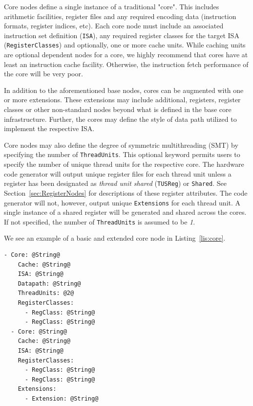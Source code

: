 \documentclass{article}
\begin{document}
Core nodes define a single instance of a traditional "core".  This includes arithmetic facilities, register files 
and any required encoding data (instruction formats, register indices, etc).  Each core node must include 
an associated instruction set definition (\texttt{ISA}), any required register classes for the target ISA (\texttt{RegisterClasses}) 
and optionally, one or more cache units.  While caching units are optional dependent nodes for a core, we 
highly recommend that cores have at least an instruction cache facility.  Otherwise, the instruction fetch 
performance of the core will be very poor.  

In addition to the aforementioned base nodes, cores can be augmented with one or more extensions.  These extensions 
may include additional, registers, register classes or other non-standard nodes beyond what is defined in the base 
core infrastructure.  Further, the cores may define the style of data path utilized to implement the respective ISA.

Core nodes may also define the degree of symmetric multithreading (SMT) by specifying the number of \texttt{ThreadUnits}.  
This optional keyword permits users to specify the number of unique thread units for the respective core.  The hardware 
code generator will output unique register files for each thread unit unless a register has been designated as 
\textit{thread unit shared} (\texttt{TUSReg}) or \texttt{Shared}.  See Section~\ref{sec:RegisterNodes} for descriptions 
of these register attributes.    
The code generator will not, however, output unique \texttt{Extensions} for each thread unit.  
A single instance of a shared register will be generated and shared across the cores.  If not specified, the number of 
\texttt{ThreadUnits} is assumed to be \textit{1}.  

We see an example of a basic and extended core node in Listing~\ref{lis:core}.   

\vspace{0.125in}
\begin{lstlisting}[frame=single,style=base,caption={Core Node Definition},captionpos=b,label={lis:core}]
- Core: @String@
    Cache: @String@
    ISA: @String@
    Datapath: @String@
    ThreadUnits: @2@
    RegisterClasses:
      - RegClass: @String@
      - RegClass: @String@
  - Core: @String@
    Cache: @String@
    ISA: @String@
    RegisterClasses:
      - RegClass: @String@
      - RegClass: @String@
    Extensions:
      - Extension: @String@
\end{lstlisting}
\end{document}
